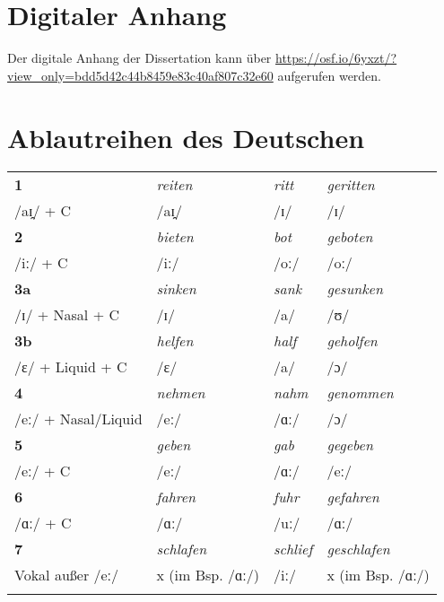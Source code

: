 \chapter{Digitaler Anhang}

Der digitale Anhang der Dissertation kann über \url{https://osf.io/6yxzt/?view\_only=bdd5d42c44b8459e83c40af807c32e60} aufgerufen werden.

\chapter{Ablautreihen des Deutschen}
\label{ablautreihe}

\begin{table}
\begin{tabular}{llll}
\lsptoprule
\textbf{1} &\textit{reiten}& \textit{ritt}& \textit{geritten} \\
/aɪ̯/ + C & /aɪ̯/  & /ɪ/ & /ɪ/ \\
\midrule
\textbf{2} &\textit{bieten} &\textit{bot}& \textit{geboten}\\
/iː/ + C & /iː/ & /oː/ & /oː/ \\
\midrule
\textbf{3a} & \textit{sinken}& \textit{sank}& \textit{gesunken}\\
/ɪ/ + Nasal + C & /ɪ/ & /a/ & /ʊ/ \\
\textbf{3b} &\textit{helfen}& \textit{half}& \textit{geholfen}\\
/ɛ/ + Liquid + C & /ɛ/ & /a/ & /ɔ/ \\  
\midrule
\textbf{4} & \textit{nehmen}& \textit{nahm} &\textit{genommen}\\
/eː/ + Nasal/Liquid & /eː/ & /ɑː/ & /ɔ/\\
\midrule
\textbf{5} &\textit{geben}& \textit{gab}& \textit{gegeben}\\
/eː/ + C & /eː/ & /ɑː/ & /eː/ \\
\midrule
\textbf{6} &\textit{fahren}& \textit{fuhr}& \textit{gefahren}\\
/ɑː/ + C & /ɑː/ & /uː/ & /ɑː/ \\
\midrule
\textbf{7} &\textit{schlafen} &\textit{schlief} &\textit{geschlafen}\\
Vokal außer /eː/ & x {\tiny{(im Bsp. /ɑː/)}} & /iː/ & x {\tiny{(im Bsp. /ɑː/)}}\\
\lspbottomrule
\end{tabular}
\label{ARov}
\end{table}

